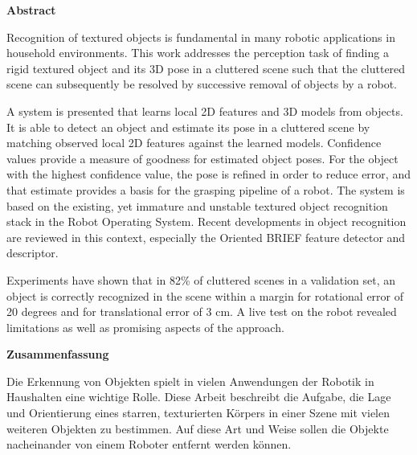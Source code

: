 

\clearemptydoublepage
{}
{}	

\vspace*{2cm}
\begin{center}
{\Large \bf Abstract}
\end{center}
\vspace{1cm}

Recognition of textured objects is fundamental in many robotic applications in
household environments. This work addresses the perception task of finding a
rigid textured object and its 3D pose in a cluttered scene such that the
cluttered scene can subsequently be resolved by successive removal of objects
by a robot.

A system is presented that learns local 2D features and 3D models from objects.
It is able to detect an object and estimate its pose in a cluttered scene by
matching observed local 2D features against the learned models.  Confidence
values provide a measure of goodness for estimated object poses. For the object
with the highest confidence value, the pose is refined in order to reduce
error, and that estimate provides a basis for the grasping pipeline of a robot.
The system is based on the existing, yet immature and unstable textured object
recognition stack in the Robot Operating System. Recent developments in object
recognition are reviewed in this context, especially the Oriented BRIEF feature
detector and descriptor.

Experiments have shown that in 82\% of cluttered scenes in a validation set, an
object is correctly recognized in the scene within a margin for rotational
error of 20 degrees and for translational error of 3 cm.  A live test on the robot
revealed limitations as well as promising aspects of the approach.

\clearemptydoublepage
{}
{}

\vspace*{2cm}
\begin{center}
{\Large \bf Zusammenfassung}
\end{center}
\vspace{1cm}


Die Erkennung von Objekten spielt in vielen Anwendungen der Robotik in
Haushalten eine wichtige Rolle. Diese Arbeit beschreibt die Aufgabe, die Lage
und Orientierung eines starren, texturierten Körpers in einer Szene mit vielen
weiteren Objekten zu bestimmen. Auf diese Art und Weise sollen die Objekte
nacheinander von einem Roboter entfernt werden können.

